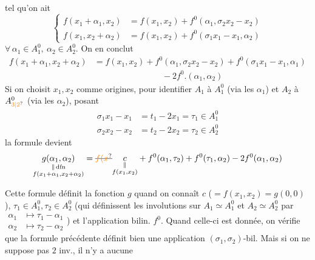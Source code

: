  tel qu'on ait
\[
 \boxed{\left\{\begin{aligned}
 f(x_1+\alpha_1,x_2)&=f(x_1,x_2)+f^0(\alpha_1,\sigma_2x_2-x_2)\\
 f(x_1,x_2+\alpha_2)&=f(x_1,x_2)+f^0(\sigma_1x_1-x_1,\alpha_2)
 \end{aligned}\right.}\tag*{$(*)$}
\]
$\forall\,\alpha_1\in A_1^0,\ \alpha_2\in A_2^0$. On en conclut
\[
 \boxed{\begin{aligned}
 f(x_1+\alpha_1,x_2+\alpha_2)&=f(x_1,x_2)+f^0(\alpha_1,\sigma_2x_2-x_2)+f^0(\sigma_1x_1-x_1,\alpha_1)\\
 &\hspace{8em}-2f^0.(\alpha_1,\alpha_2)
 \end{aligned}}
\]
Si on choisit $x_1,x_2$ comme origines, pour identifier $A_1$ à $A_1^0$ (via les $\alpha_1$) et $A_2$ à $A_{\unsure{3|2}}^0$ (via les $\alpha_2$), posant
\[
 \begin{aligned}
 \sigma_1x_1-x_1&=t_1-2x_1=\tau_1\in A_1^0\\
 \sigma_2x_2-x_2&=t_2-2x_2=\tau_2\in A_2^0
 \end{aligned}
\]
la formule devient
\[
 \underset{\substack{\Vert\,\mathrm{dfn}\\ f(x_1+\alpha_1,x_2+\alpha_2)}}{g(\alpha_1,\alpha_2)}
 =\deleted{\unsure{f(x}}\underset{\substack{\Vert\\ f(x_1,x_2)}}{c}+f^0(\alpha_1,\tau_2)+f^0(\tau_1,\alpha_2)-2f^0(\alpha_1,\alpha_2)
\]

 Cette formule définit  la fonction $g$  quand on connaît $c$ ($=f(x_1,x_2)=g(0,0)$),  $\tau_1\in A_1^0,\tau_2\in A_2^0$ (qui définissent les involutions sur $A_1\simeq A_1^0$  et $A_2\simeq A_2^0$  par $\begin{aligned}\alpha_1&\longmapsto\tau_1-\alpha_1\\\alpha_2&\longmapsto\tau_2-\alpha_2\end{aligned}$) et l'application bilin. $f^0$. Quand celle-ci est donnée, on vérifie que la formule précédente définit bien une application $(\sigma_1,\sigma_2)$-bil. Mais si on ne suppose pas $2$ inv., il n'y a aucune

